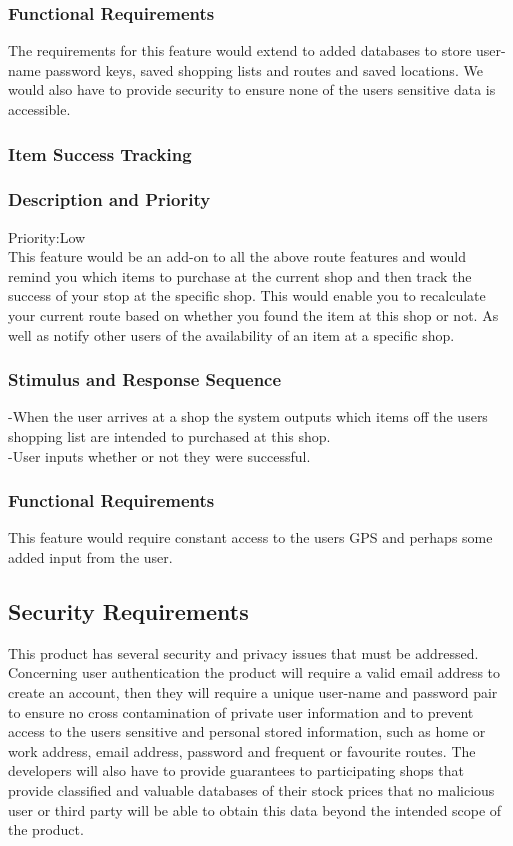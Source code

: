 \documentclass[12pt]{article}
\begin{document}
 \subsubsection*{Functional Requirements}
The requirements for this feature would extend to added databases to store user-name password keys,  saved shopping lists and routes and saved locations. We would also have to provide security to ensure none of the users sensitive data is accessible. 

 \subsubsection{Item Success Tracking}
\subsubsection*{Description and Priority}
 Priority:Low\\
 This feature would be an add-on to all the above route features and would remind you which items to purchase at the current shop and then track the success of your stop at the specific shop. This would enable you to recalculate your current route based on whether you found the item at this shop or not. As well as notify other users of the availability of an item at a specific shop.  
 \subsubsection*{Stimulus and Response Sequence}
-When the user arrives at a shop the system outputs which items off  the users shopping list are intended to purchased at this shop.\\
-User  inputs whether or not they were successful.
 \subsubsection*{Functional Requirements}
 This feature would require constant access to the users GPS and perhaps some added input from the user.
 
 \subsection{Security Requirements}
 This product has several security and privacy issues that must be addressed. Concerning user authentication the product will require a valid email address to create an account, then they will require a unique user-name and password pair to ensure no cross contamination of private user information and to prevent access to the users sensitive and personal stored information, such as home or work address, email address, password and frequent or favourite routes. The developers will also have to provide guarantees to participating shops that provide classified and valuable databases of their stock prices that no malicious user or third party will be able to obtain this data beyond the intended scope of the product. \\
\end{document}
